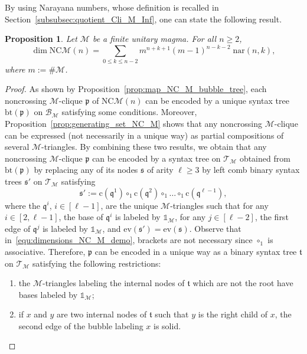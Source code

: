 \documentclass[10pt,reqno]{amsart}
\numberwithin{equation}{subsection}
\renewcommand{\leq}{\leqslant}
\renewcommand{\geq}{\geqslant}
\newtheorem{Proposition}[Theorem]{Proposition}
\newcommand{\Mca}{\mathcal{M}}
\newcommand{\Tfr}{\mathfrak{t}}
\newcommand{\Sfr}{\mathfrak{s}}
\newcommand{\Pfr}{\mathfrak{p}}
\newcommand{\Qfr}{\mathfrak{q}}
\newcommand{\NC}{\mathrm{NC}}
\newcommand{\Unit}{\mathds{1}}
\newcommand{\Nar}{\mathrm{nar}}
\newcommand{\Eval}{\mathrm{ev}}
\newcommand{\Corolla}{\mathrm{c}}
\newcommand{\Bubbles}{\mathcal{B}}
\newcommand{\Triangles}{\mathcal{T}}
\newcommand{\BubbleTree}{\mathrm{bt}}
\begin{document}
By using Narayana numbers, whose definition is recalled in
Section~\ref{subsubsec:quotient_Cli_M_Inf}, one can state the following
result.
\medskip

\begin{Proposition} \label{prop:dimensions_NC_M}
    Let $\Mca$ be a finite unitary magma. For all $n \geq 2$,
    \begin{equation} \label{equ:dimensions_NC_M}
        \dim \NC\Mca(n) =
        \sum_{0 \leq k \leq n - 2}
            m^{n + k + 1} (m - 1)^{n - k - 2} \;
            \Nar(n, k),
    \end{equation}
    where $m := \# \Mca$.
\end{Proposition}
\begin{proof}
    As shown by Proposition~\ref{prop:map_NC_M_bubble_tree}, each
    noncrossing $\Mca$-clique $\Pfr$ of $\NC\Mca(n)$ can be encoded by a
    unique syntax tree $\BubbleTree(\Pfr)$ on $\Bubbles_\Mca$ satisfying
    some conditions. Moreover,
    Proposition~\ref{prop:generating_set_NC_M} shows that any
    noncrossing $\Mca$-clique can be expressed (not necessarily in a
    unique way) as partial compositions of several $\Mca$-triangles. By
    combining these two results, we obtain that any noncrossing
    $\Mca$-clique $\Pfr$ can be encoded by a syntax tree on
    $\Triangles_\Mca$ obtained from $\BubbleTree(\Pfr)$ by replacing any
    of its nodes $\Sfr$ of arity $\ell \geq 3$ by left comb binary
    syntax trees $\Sfr'$ on $\Triangles_\Mca$ satisfying
    \begin{equation} \label{equ:dimensions_NC_M_demo}
        \Sfr' :=
        \Corolla\left(\Qfr^1\right) \circ_1
        \Corolla\left(\Qfr^2\right) \circ_1 \dots \circ_1
        \Corolla\left(\Qfr^{\ell - 1}\right),
    \end{equation}
    where the $\Qfr^i$, $i \in [\ell - 1]$, are the unique
    $\Mca$-triangles such that for any $i \in [2, \ell - 1]$, the base
    of $\Qfr^i$ is labeled by $\Unit_\Mca$, for any $j \in [\ell - 2]$,
    the first edge of $\Qfr^j$ is labeled by $\Unit_\Mca$, and
    $\Eval(\Sfr') = \Eval(\Sfr)$. Observe that
    in~\eqref{equ:dimensions_NC_M_demo}, brackets are not necessary
    since $\circ_1$ is associative. Therefore, $\Pfr$ can be encoded in
    a unique way as a binary syntax tree $\Tfr$ on $\Triangles_\Mca$
    satisfying the following restrictions:
    \begin{enumerate}[fullwidth,label={(\it\roman*)}]
        \item the $\Mca$-triangles labeling the internal nodes of
        $\Tfr$ which are not the root have bases labeled by $\Unit_\Mca$;
        \item if $x$ and $y$ are two internal nodes of $\Tfr$ such that
        $y$ is the right child of $x$, the second edge of the bubble
        labeling $x$ is solid.
    \end{enumerate}
    \smallskip


\end{proof}
\end{document}
